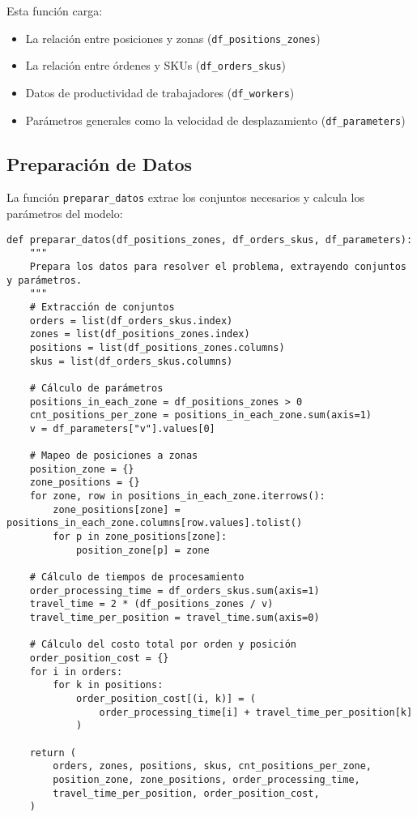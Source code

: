 \documentclass{hw-template}
\begin{document}
Esta función carga:
\begin{itemize}
    \item La relación entre posiciones y zonas (\texttt{df\_positions\_zones})
    \item La relación entre órdenes y SKUs (\texttt{df\_orders\_skus})
    \item Datos de productividad de trabajadores (\texttt{df\_workers})
    \item Parámetros generales como la velocidad de desplazamiento (\texttt{df\_parameters})
\end{itemize}

\subsection{Preparación de Datos}

La función \texttt{preparar\_datos} extrae los conjuntos necesarios y calcula los parámetros del modelo:

\begin{verbatim}
def preparar_datos(df_positions_zones, df_orders_skus, df_parameters):
    """
    Prepara los datos para resolver el problema, extrayendo conjuntos y parámetros.
    """
    # Extracción de conjuntos
    orders = list(df_orders_skus.index)
    zones = list(df_positions_zones.index)
    positions = list(df_positions_zones.columns)
    skus = list(df_orders_skus.columns)

    # Cálculo de parámetros
    positions_in_each_zone = df_positions_zones > 0
    cnt_positions_per_zone = positions_in_each_zone.sum(axis=1)
    v = df_parameters["v"].values[0]

    # Mapeo de posiciones a zonas
    position_zone = {}
    zone_positions = {}
    for zone, row in positions_in_each_zone.iterrows():
        zone_positions[zone] = positions_in_each_zone.columns[row.values].tolist()
        for p in zone_positions[zone]:
            position_zone[p] = zone

    # Cálculo de tiempos de procesamiento
    order_processing_time = df_orders_skus.sum(axis=1)
    travel_time = 2 * (df_positions_zones / v)
    travel_time_per_position = travel_time.sum(axis=0)

    # Cálculo del costo total por orden y posición
    order_position_cost = {}
    for i in orders:
        for k in positions:
            order_position_cost[(i, k)] = (
                order_processing_time[i] + travel_time_per_position[k]
            )

    return (
        orders, zones, positions, skus, cnt_positions_per_zone,
        position_zone, zone_positions, order_processing_time,
        travel_time_per_position, order_position_cost,
    )
\end{verbatim}
\end{document}
